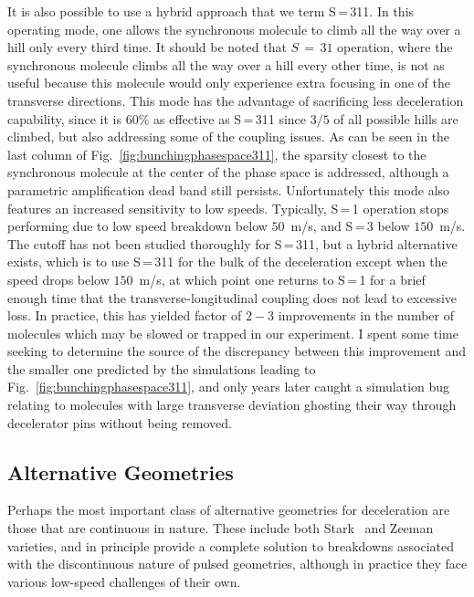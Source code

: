 It is also possible to use a hybrid approach that we term S\,=\,311.
In this operating mode, one allows the synchronous molecule to climb all the way over a hill only every third time.
It should be noted that $S\,=\,31$ operation, where the synchronous molecule climbs all the way over a hill every other time, is not as useful because this molecule would only experience extra focusing in one of the transverse directions.
This mode has the advantage of sacrificing less deceleration capability, since it is $60\%$ as effective as S\,=\,311 since $3/5$ of all possible hills are climbed, but also addressing some of the coupling issues.
As can be seen in the last column of Fig.~\ref{fig:bunchingphasespace311}, the sparsity closest to the synchronous molecule at the center of the phase space is addressed, although a parametric amplification dead band still persists.
Unfortunately this mode also features an increased sensitivity to low speeds.
Typically, S\,=\,1 operation stops performing due to low speed breakdown below $50$~m/s, and S\,=\,3 below $150$~m/s.
The cutoff has not been studied thoroughly for S\,=\,311, but a hybrid alternative exists, which is to use S\,=\,311 for the bulk of the deceleration except when the speed drops below $150$~m/s, at which point one returns to S\,=\,1 for a brief enough time that the transverse-longitudinal coupling does not lead to excessive loss.
In practice, this has yielded factor of $2-3$ improvements in the number of molecules which may be slowed or trapped in our experiment.
I spent some time seeking to determine the source of the discrepancy between this improvement and the smaller one predicted by the simulations leading to Fig.~\ref{fig:bunchingphasespace311}, and only years later caught a simulation bug relating to molecules with large transverse deviation ghosting their way through decelerator pins without being removed.

\subsection{Alternative Geometries}

Perhaps the most important class of alternative geometries for deceleration are those that are continuous in nature. 
These include both Stark~\cite{Osterwalder2010} and Zeeman~\cite{Narevicius2008} varieties, and in principle provide a complete solution to breakdowns associated with the discontinuous nature of pulsed geometries, although in practice they face various low-speed challenges of their own.

